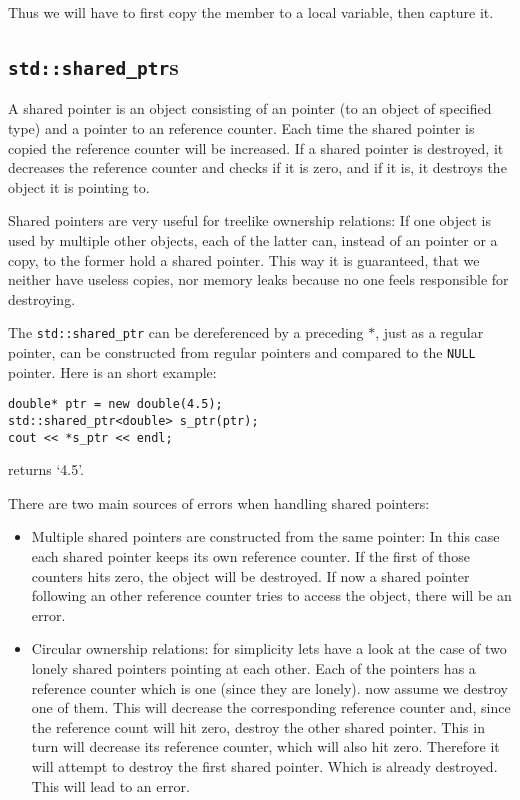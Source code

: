 \documentclass{article}
\newcommand{\code}[1]{\texttt{#1}}
\newcommand{\NULL}{\texttt{NULL} pointer\xspace}
\begin{document}
Thus we will have to first copy the member to a local variable, then capture it.

\subsection{\code{std::shared\_ptr}s}

A shared pointer is an object consisting of an pointer (to an object of specified type) and a pointer to an reference counter. Each time the shared pointer is copied the reference counter will be increased. If a shared pointer is destroyed, it decreases the reference counter and checks if it is zero, and if it is, it destroys the object it is pointing to.

Shared pointers are very useful for treelike ownership relations: If one object is used by multiple other objects, each of the latter can, instead of an pointer or a copy, to the former hold a shared pointer. This way it is guaranteed, that we neither have useless copies, nor memory leaks because no one feels responsible for destroying.

The \code{std::shared\_ptr} can be dereferenced by a preceding $*$, just as a regular pointer, can be constructed from regular pointers and compared to the \NULL. Here is an short example:

\begin{lstlisting}
double* ptr = new double(4.5);
std::shared_ptr<double> s_ptr(ptr);
cout << *s_ptr << endl;
\end{lstlisting}
returns \lq 4.5\rq.

There are two main sources of errors when handling shared pointers:
\begin{itemize}
\item Multiple shared pointers are constructed from the same pointer: In this case each shared pointer keeps its own reference counter. If the first of those counters hits zero, the object will be destroyed. If now a shared pointer following an other reference counter tries to access the object, there will be an error.
\item Circular ownership relations: for simplicity lets have a look at the case of two lonely shared pointers pointing at each other. Each of the pointers has a reference counter which is one (since they are lonely). now assume we destroy one of them. This will decrease the corresponding reference counter and, since the reference count will hit zero, destroy the other shared pointer. This in turn will decrease its reference counter, which will also hit zero. Therefore it will attempt to destroy the first shared pointer. Which is already destroyed. This will lead to an error.
\end{itemize}
\end{document}
